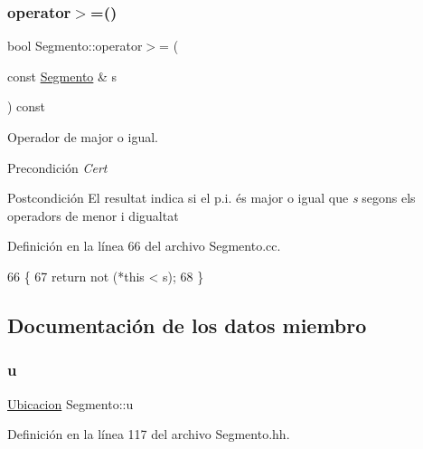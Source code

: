 \subsubsection{\texorpdfstring{operator$>$=()}{operator>=()}}
{\footnotesize\ttfamily bool Segmento\+::operator$>$= (\begin{DoxyParamCaption}\item[{const \hyperlink{class_segmento}{Segmento} \&}]{s }\end{DoxyParamCaption}) const}



Operador de major o igual. 

\begin{DoxyPrecond}{Precondición}
{\itshape Cert} 
\end{DoxyPrecond}
\begin{DoxyPostcond}{Postcondición}
El resultat indica si el p.\+i. és major o igual que {\itshape s} segons els operadors de menor i d\textquotesingle{}igualtat 
\end{DoxyPostcond}


Definición en la línea 66 del archivo Segmento.\+cc.


\begin{DoxyCode}
66                                                  \{
67   \textcolor{keywordflow}{return} not (*\textcolor{keyword}{this} < s);
68 \}
\end{DoxyCode}


\subsection{Documentación de los datos miembro}
\mbox{\label{class_segmento_a7fab9490df9b1b655bb88c2deb6e72ef}} 
\subsubsection{\texorpdfstring{u}{u}}
{\footnotesize\ttfamily \hyperlink{class_ubicacion}{Ubicacion} Segmento\+::u\hspace{0.3cm}{\ttfamily [private]}}



Definición en la línea 117 del archivo Segmento.\+hh.

\mbox{\label{class_segmento_a8b59abc9de156b52370dd759beab031d}} 
